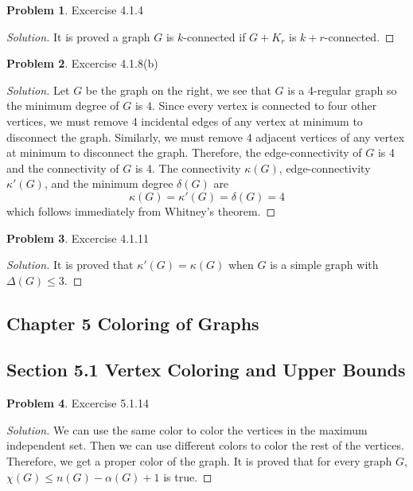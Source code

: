 \documentclass[12pt]{article}
\theoremstyle{definition}
\newtheorem{problem}{Problem}
\newenvironment*{solution}{\begin{proof}[Solution]}{\end{proof}}
\begin{document}
\begin{problem}
    Excercise 4.1.4
\end{problem}
\begin{solution}
    It is proved a graph \(G\) is \(k\)-connected if \(G+K_r\) is
    \(k+r\)-connected.
\end{solution}

\begin{problem}
    Excercise 4.1.8(b)
\end{problem}
\begin{solution}
    Let \(G\) be the graph on the right, we see that \(G\) is a 4-regular
    graph so the minimum degree of \(G\) is 4.
    Since every vertex is connected to four other vertices,
    we must remove 4 incidental edges of any vertex at minimum to disconnect
    the graph.
    Similarly, we must remove 4 adjacent vertices of any vertex at minimum to
    disconnect the graph.
    Therefore, the edge-connectivity of \(G\) is 4 and the connectivity of
    \(G\) is 4.
    The connectivity \(\kappa(G)\), edge-connectivity \(\kappa'(G)\), and the
    minimum degree \(\delta(G)\) are
    \[\kappa(G) = \kappa'(G) = \delta(G) = 4\] which follows immediately from
    Whitney's theorem.
\end{solution}

\begin{problem}
    Excercise 4.1.11
\end{problem}
\begin{solution}
    It is proved that \(\kappa'(G)=\kappa(G)\) when \(G\) is a simple graph
    with \(\Delta(G)\leq3\).
\end{solution}

\subsection*{Chapter 5 Coloring of Graphs}
\subsection*{Section 5.1 Vertex Coloring and Upper Bounds}
\begin{problem}
    Excercise 5.1.14
\end{problem}
\begin{solution}
    We can use the same color to color the vertices in the maximum independent
    set.
    Then we can use different colors to color the rest of the vertices.
    Therefore, we get a proper color of the graph.
    It is proved that for every graph \(G\), \(\chi(G) \leq n(G)-\alpha(G)+1\)
    is true.
\end{solution}
\end{document}
